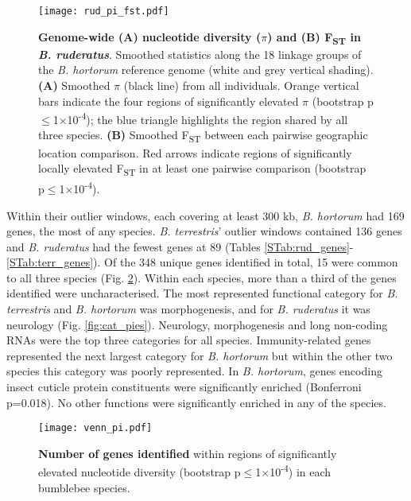 \documentclass[12pt]{article}
\begin{document}
\begin{linenumbers}
	\begin{figure}[ht!]
		\centering
		\texttt{[image: rud\_pi\_fst.pdf]}
		\captionsetup{width=0.88\linewidth}
		\caption{\textbf{Genome-wide (A) nucleotide diversity ($\pi$) and (B) F\textsubscript{ST} in \emph{B. ruderatus}}. Smoothed statistics along the 18 linkage groups of the \emph{B. hortorum} reference genome (white and grey vertical shading). \textbf{(A)} Smoothed $\pi$ (black line) from all individuals. Orange vertical bars indicate the four regions of significantly elevated $\pi$ (bootstrap p$\leq$1$\times$10\textsuperscript{-4}); the blue triangle highlights the region shared by all three species. \textbf{(B)} Smoothed F\textsubscript{ST} between each pairwise geographic location comparison. Red arrows indicate regions of significantly locally elevated F\textsubscript{ST} in at least one pairwise comparison (bootstrap p$\leq$1$\times$10\textsuperscript{-4}).}
		\label{fig:rud_pi_fst}
	\end{figure}

	Within their outlier windows, each covering at least 300 kb, \emph{B. hortorum} had 169 genes, the most of any species. \emph{B. terrestris}' outlier windows contained 136 genes and \emph{B. ruderatus} had the fewest genes at 89 (Tables \ref{STab:rud_genes}-\ref{STab:terr_genes}). Of the 348 unique genes identified in total, 15 were common to all three species (Fig. \ref{fig:venn_pi}). Within each species, more than a third of the genes identified were uncharacterised. The  most represented functional category for \emph{B. terrestris} and \emph{B. hortorum} was morphogenesis, and for \emph{B. ruderatus} it was neurology (Fig. \ref{fig:cat_pies}). Neurology, morphogenesis and long non-coding RNAs were the top three categories for all species. Immunity-related genes represented the next largest category for \emph{B. hortorum} but within the other two species this category was poorly represented. In \emph{B. hortorum}, genes encoding insect cuticle protein constituents were significantly enriched (Bonferroni p=0.018). No other functions were significantly enriched in any of the species.
	
	\begin{figure}[ht!]
		\centering
		\texttt{[image: venn\_pi.pdf]}
		\captionsetup{width=0.88\linewidth}
		\caption{\textbf{Number of genes identified} within regions of significantly elevated nucleotide diversity (bootstrap p$\leq$1$\times$10\textsuperscript{-4}) in each bumblebee species.}
		\label{fig:venn_pi}
	\end{figure}
	


\end{linenumbers}
\end{document}
